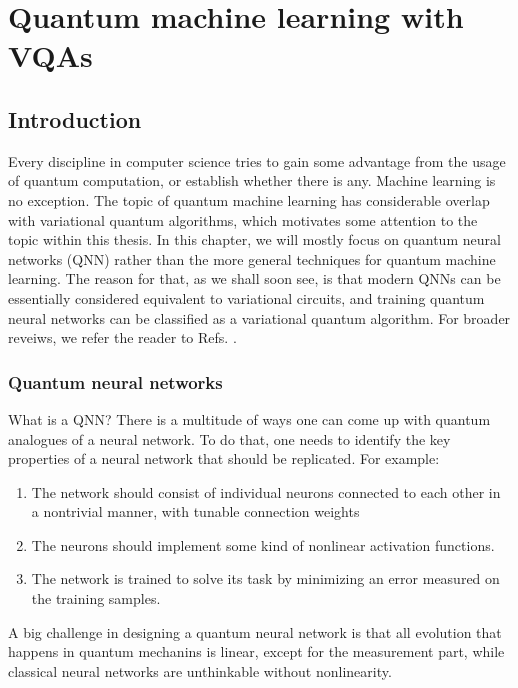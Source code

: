 \chapter{Quantum machine learning with VQAs}
\label{chap:qml}

\section{Introduction}

Every discipline in computer science tries to gain some advantage from the usage of quantum computation, or establish whether there is any. Machine learning is no exception. The topic of quantum machine learning has considerable overlap with variational quantum algorithms, which motivates some attention to the topic within this thesis. In this chapter, we will mostly focus on quantum neural networks (QNN) rather than the more general techniques for quantum machine learning. The reason for that, as we shall soon see, is that modern QNNs can be essentially considered equivalent to variational circuits, and training quantum neural networks can be classified as a variational quantum algorithm. For broader reveiws, we refer the reader to Refs. \cite{schuld_introduction_2015,biamonte_quantum_2017, ciliberto_quantum_2018}.

\subsection{Quantum neural networks}
 
What is a QNN? There is a multitude of ways one can come up with quantum analogues of a neural network. To do that, one needs to identify the key properties of a neural network that should be replicated. For example:

\begin{enumerate}
\item The network should consist of individual neurons connected to each other in a nontrivial manner, with tunable connection weights
\item The neurons should implement some kind of nonlinear activation functions.
\item The network is trained to solve its task by minimizing an error measured on the training samples.
\end{enumerate}


A big challenge in designing a quantum neural network is that all evolution that happens in quantum mechanins is linear, except for the measurement part, while classical neural networks are unthinkable without nonlinearity. 


